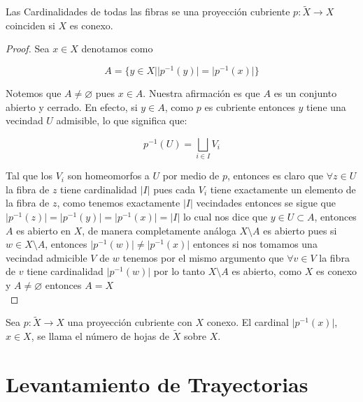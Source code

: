 \begin{theorem}
Las Cardinalidades de todas las fibras se una proyecci\'on cubriente $p: \widetilde{X} \rightarrow X$ coinciden si $X$ es conexo.
\end{theorem}

\begin{proof}
Sea $x \in X$ denotamos como 

$$A=\lbrace y \in X \vert  \vert p^{-1}(y) \vert= \vert p^{-1}(x)\vert \rbrace$$

Notemos que $A \neq \varnothing$ pues $x \in A$. Nuestra  afirmaci\'on es que $A$ es un conjunto abierto y cerrado. En efecto, si $y \in A$, como $p$ es cubriente entonces $y$ tiene una vecindad $U$ admisible, lo que significa que: 

$$p^{-1}(U)=\bigsqcup_{i \in I}V_i$$ 

Tal que los $V_i$ son homeomorfos a $U$ por medio de $p$, entonces es claro que $\forall z \in U$ la fibra de $z$ tiene cardinalidad $\vert I \vert$ pues cada $V_i$ tiene exactamente un elemento de la fibra de $z$, como tenemos exactamente $\vert I \vert$ vecindades entonces se sigue que $\vert p^{-1}(z) \vert = \vert p^{-1}(y) \vert = \vert p^{-1}(x) \vert =\vert I \vert$ lo cual nos dice que $y \in U \subset A$, entonces $A$ es abierto en $X$, de manera completamente an\'aloga $X \setminus A$ es abierto pues si $w \in X \setminus A$, entonces $\vert p^{-1}(w) \vert \neq \vert p^{-1}(x) \vert$ entonces si nos tomamos una vecindad admicible $V$ de $w$ tenemos por el mismo argumento que $\forall v \in V$ la fibra de $v$ tiene cardinalidad $\vert p^{-1}(w) \vert$ por lo tanto $X \setminus A$ es abierto, como $X$ es conexo y $A \neq \varnothing$ entonces $A=X$\\  

\end{proof}

\begin{definition}
Sea $p: \widetilde{X} \rightarrow X$ una proyecci\'on cubriente con $X$ conexo. El cardinal $\vert p^{-1}(x) \vert$, $x \in X$, se llama el n\'umero de hojas de $\widetilde{X}$ sobre $X$.\\
\end{definition}


\section{Levantamiento de Trayectorias}

